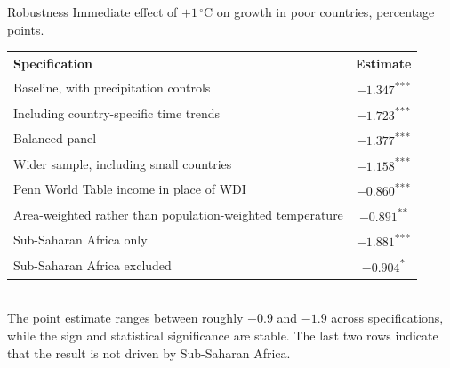 \documentclass[aspectratio=169,10pt]{beamer}
\newcommand{\stars}[1]{\textsuperscript{#1}}
\begin{document}
\begin{frame}{Robustness}
  \centering
  \small Immediate effect of $+1\,^\circ$C on growth in poor countries, percentage
  points.
  \vspace{4pt}

  \footnotesize
  \begin{tabular}{@{}lc@{}}
    \toprule
    \textbf{Specification} & \textbf{Estimate} \\
    \midrule
    Baseline, with precipitation controls & $-1.347$\stars{***} \\
    Including country-specific time trends & $-1.723$\stars{***} \\
    Balanced panel & $-1.377$\stars{***} \\
    Wider sample, including small countries & $-1.158$\stars{***} \\
    Penn World Table income in place of WDI & $-0.860$\stars{***} \\
    Area-weighted rather than population-weighted temperature & $-0.891$\stars{**} \\
    Sub-Saharan Africa only & $-1.881$\stars{***} \\
    Sub-Saharan Africa excluded & $-0.904$\stars{*} \\
    \bottomrule
  \end{tabular}
  \vspace{4pt}
  \\ \small The point estimate ranges between roughly $-0.9$ and $-1.9$ across
  specifications, while the sign and statistical significance are stable. The last two
  rows indicate that the result is not driven by Sub-Saharan Africa.
\end{frame}
\end{document}
